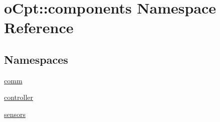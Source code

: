 \hypertarget{namespaceo_cpt_1_1components}{}\section{o\+Cpt\+:\+:components Namespace Reference}
\label{namespaceo_cpt_1_1components}
\subsection*{Namespaces}
\begin{DoxyCompactItemize}
\item 
 \hyperlink{namespaceo_cpt_1_1components_1_1comm}{comm}
\item 
 \hyperlink{namespaceo_cpt_1_1components_1_1controller}{controller}
\item 
 \hyperlink{namespaceo_cpt_1_1components_1_1sensors}{sensors}
\end{DoxyCompactItemize}
